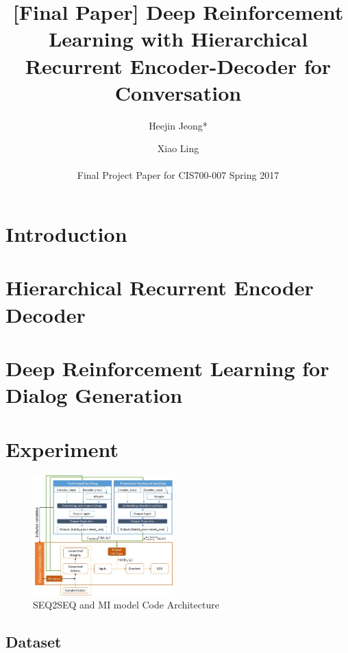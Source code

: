 \documentclass[letterpaper]{article}
\begin{document}
%
\title{[Final Paper] Deep Reinforcement Learning with Hierarchical Recurrent Encoder-Decoder for Conversation }
\author{Heejin Jeong* \and Xiao Ling \\ \\
  Final Project Paper for CIS700-007 Spring 2017\\}

\maketitle

\section{Introduction}


\section{Hierarchical Recurrent Encoder Decoder}
%

\section{Deep Reinforcement Learning for Dialog Generation}


\section{Experiment}

\begin{figure}[bt!]
    \centering
    \includegraphics[width=0.48\textwidth]{mi_architecture} 
    \caption{\small SEQ2SEQ and MI model Code Architecture}
    \label{fig:mi_architecture}
 \end{figure}

\subsection{Dataset}

\end{document}
